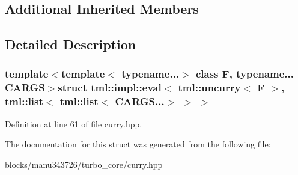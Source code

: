\subsection*{Additional Inherited Members}


\subsection{Detailed Description}
\subsubsection*{template$<$template$<$ typename...$>$ class F, typename... C\+A\+R\+G\+S$>$struct tml\+::impl\+::eval$<$ tml\+::uncurry$<$ F $>$, tml\+::list$<$ tml\+::list$<$ C\+A\+R\+G\+S...$>$ $>$ $>$}



Definition at line 61 of file curry.\+hpp.



The documentation for this struct was generated from the following file\+:\begin{DoxyCompactItemize}
\item 
blocks/manu343726/turbo\+\_\+core/curry.\+hpp\end{DoxyCompactItemize}
